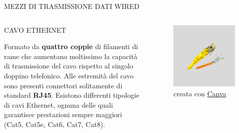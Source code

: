 \documentclass[aspectratio=1610,handout]{beamer}
\begin{document}
\begin{frame}{MEZZI DI TRASMISSIONE DATI WIRED}
    \begin{columns}
        \begin{alertblock}{CAVO ETHERNET}
            \begin{minipage}{0.97\linewidth}
                \justifying
                Formato da \textbf{quattro coppie} di filamenti di rame che aumentano moltissimo 
                la capacità di trasmissione del cavo rispetto al singolo doppino telefonico. 
                Alle estremità del cavo sono presenti connettori solitamente di standard \textbf{RJ45}. 
                Esistono differenti tipologie di cavi Ethernet, ognuna delle quali garantisce prestazioni 
                sempre maggiori (Cat5, Cat5e, Cat6, Cat7, Cat8).
            \end{minipage}
        \end{alertblock}
           \begin{figure}
               \includegraphics[width=\linewidth]{img/cavo_ethernet.png}
               \caption{{creata con \href{https://www.canva.com/}{Canva}}}
           \end{figure}
    \end{columns}
\end{frame}
\end{document}
